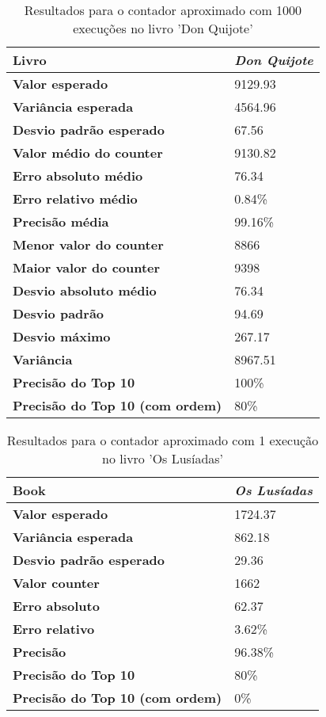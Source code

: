 \documentclass[shortpaper, portugues, times, mirror]{revdetua}
\begin{document}
\begin{table}[H]
\centering
\begin{tabular}{|l|l|}
\hline
\textbf{Livro}            & \textit{Don Quijote} \\ \hline
\textbf{Valor esperado}         & 9129.93\\ \hline
\textbf{Variância esperada}& 4564.96\\ \hline
\textbf{Desvio padrão esperado}   & 67.56\\ \hline
\hline
\textbf{Valor médio do counter}   & 9130.82\\ \hline
\textbf{Erro absoluto médio}   & 76.34\\ \hline
\textbf{Erro relativo médio}   & 0.84\%\\ \hline
\textbf{Precisão média}   & 99.16\%\\ \hline
\textbf{Menor valor do counter}   & 8866\\ \hline
\textbf{Maior valor do counter}   & 9398\\ \hline
\textbf{Desvio absoluto médio}   & 76.34\\ \hline
\textbf{Desvio padrão}   & 94.69\\ \hline
\textbf{Desvio máximo}   & 267.17\\ \hline
\textbf{Variância}   & 8967.51\\ \hline
\textbf{Precisão do Top 10}   & 100\%\\ \hline
\textbf{Precisão do Top 10 (com ordem)}   & 80\%\\ \hline
\end{tabular}
\caption{Resultados para o contador aproximado com 1000 execuções no livro 'Don Quijote'}
\label{tab:approximate}
\end{table}

\begin{table}[H]
\centering
\begin{tabular}{|l|l|}
\hline
\textbf{Book}            & \textit{Os Lusíadas}\\ \hline
\textbf{Valor esperado}         & 1724.37\\ \hline
\textbf{Variância esperada}       & 862.18\\ \hline
\textbf{Desvio padrão esperado}   & 29.36\\ \hline
\hline
\textbf{Valor counter}   & 1662\\ \hline
\textbf{Erro absoluto}   & 62.37\\ \hline
\textbf{Erro relativo}   & 3.62\%\\ \hline
\textbf{Precisão}   & 96.38\%\\ \hline
\textbf{Precisão do Top 10}   & 80\%\\ \hline
\textbf{Precisão do Top 10 (com ordem)}   & 0\%\\ \hline
\end{tabular}
\caption{Resultados para o contador aproximado com 1 execução no livro 'Os Lusíadas'}
\label{tab:approximate}
\end{table}
\end{document}
